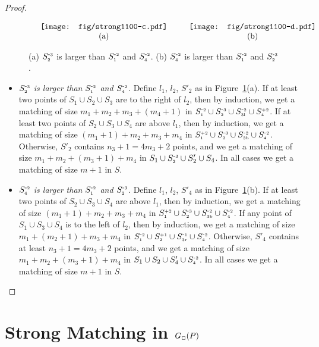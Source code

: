 \documentclass[11pt,a4paper]{article}
\newcommand{\G}[2]{G_{#1}({#2})}
\newcommand{\sqrs}{\scriptsize\Box}
\newcommand{\SP}[2]{S^{\text{\tiny +#1}}_\text{\tiny #2}}
\newcommand{\SM}[2]{S^{\text{-\tiny #1}}_\text{\tiny #2}}
\begin{document}
\begin{proof}
\begin{itemize}
\begin{figure}[h!]
  \centering
\setlength{\tabcolsep}{0in}
  $\begin{tabular}{cc}
\multicolumn{1}{m{.5\columnwidth}}{\centering\texttt{[image: fig/strong1100-c.pdf]}}
&\multicolumn{1}{m{.5\columnwidth}}{\centering\texttt{[image: fig/strong1100-d.pdf]}}
\\
(a) & (b)
\end{tabular}$
  \caption{(a) $\SM{3}{2}$ is larger than $\SM{2}{1}$ and $\SM{2}{4}$. (b) $\SM{2}{4}$ is larger than $\SM{2}{1}$ and $\SM{3}{2}$.}
\label{Theta-six-fig4}
\end{figure}
\begin{itemize}
 \item {\em $\SM{3}{2}$ is larger than $\SM{2}{1}$ and $\SM{2}{4}$.}
Define $l_1$, $l_2$, $S'_2$ as in Figure~\ref{Theta-six-fig4}(a). If at least two points of $S_1\cup S_2\cup S_3$ are to the right of $l_2$, then by induction, we get a matching of size $m_1+m_2+m_3+(m_4+1)$ in $\SM{2}{1}\cup \SM{3}{2}\cup\SM{2}{3l}\cup \SP{2}{4}$. If at least two points of $S_2\cup S_3\cup S_4$ are above $l_1$, then by induction, we get a matching of size $(m_1+1)+m_2+m_3+m_4$ in $\SP{2}{1}\cup \SM{3}{2}\cup\SM{2}{3b}\cup \SM{2}{4}$. Otherwise, $S'_2$ contains $n_3+1=4m_3+2$ points, and we get a matching of size $m_1+m_2+(m_3+1)+ m_4$ in $S_1\cup \SM{3}{2}\cup S'_2\cup S_4$. In all cases we get a matching of size $m+1$ in $S$.

\item {\em $\SM{2}{4}$ is larger than $\SM{2}{1}$ and $\SM{3}{2}$.}
Define $l_1$, $l_2$, $S'_4$ as in Figure~\ref{Theta-six-fig4}(b). If at least two points of $S_2\cup S_3\cup S_4$ are above $l_1$, then by induction, we get a matching of size $(m_1+1)+m_2+m_3+m_4$ in $\SP{2}{1}\cup \SM{3}{2}\cup\SM{2}{3b}\cup \SM{2}{4}$. If any point of $S_1\cup S_3\cup S_4$ is to the left of $l_2$, then by induction, we get a matching of size $m_1+(m_2+1)+m_3+m_4$ in $\SM{2}{1}\cup \SP{1}{2}\cup\SM{1}{3r}\cup \SM{2}{4}$. Otherwise, $S'_4$ contains at least $n_3+1=4m_3+2$ points, and we get a matching of size $m_1+m_2+(m_3+1)+ m_4$ in $S_1\cup S_2\cup S'_4\cup \SM{2}{4}$. In all cases we get a matching of size $m+1$ in $S$. 
\end{itemize}
\end{itemize}
\end{proof}
\section{Strong Matching in 
$\G{\sqrs}{P}$}
\end{document}
